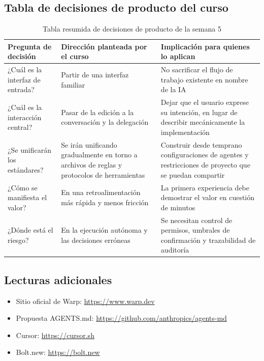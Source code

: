 \documentclass[a4paper]{article}
\begin{document}
\subsection{Tabla de decisiones de producto del curso}

\begin{table}[H]
\centering
\begin{tabular}{p{} p{} p{}}
\toprule
Pregunta de decisión & Dirección planteada por el curso & Implicación para quienes lo aplican \\
\midrule
¿Cuál es la interfaz de entrada? & Partir de una interfaz familiar & No sacrificar el flujo de trabajo existente en nombre de la IA \\
¿Cuál es la interacción central? & Pasar de la edición a la conversación y la delegación & Dejar que el usuario exprese su intención, en lugar de describir mecánicamente la implementación \\
¿Se unificarán los estándares? & Se irán unificando gradualmente en torno a archivos de reglas y protocolos de herramientas & Construir desde temprano configuraciones de agentes y restricciones de proyecto que se puedan compartir \\
¿Cómo se manifiesta el valor? & En una retroalimentación más rápida y menos fricción & La primera experiencia debe demostrar el valor en cuestión de minutos \\
¿Dónde está el riesgo? & En la ejecución autónoma y las decisiones erróneas & Se necesitan control de permisos, umbrales de confirmación y trazabilidad de auditoría \\
\bottomrule
\end{tabular}
\caption{Tabla resumida de decisiones de producto de la semana 5}
\end{table}

\subsection{Lecturas adicionales}

\begin{itemize}
    \item Sitio oficial de Warp: \url{https://www.warp.dev}
    \item Propuesta AGENTS.md: \url{https://github.com/anthropics/agents-md}
    \item Cursor: \url{https://cursor.sh}
    \item Bolt.new: \url{https://bolt.new}
\end{itemize}

\end{document}
